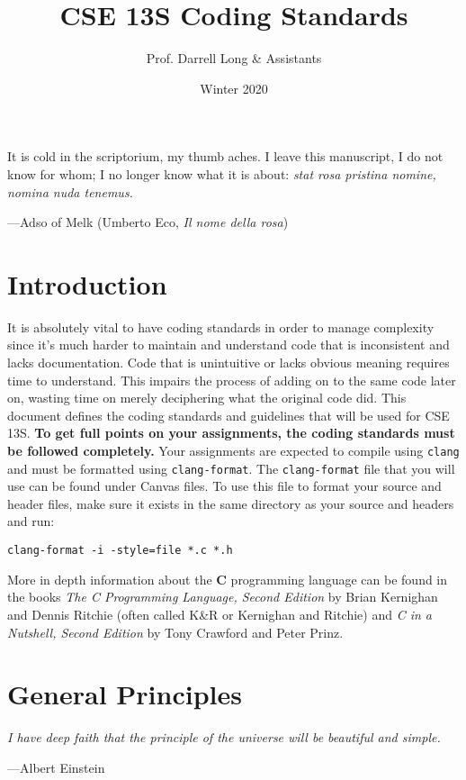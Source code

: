 \documentclass[11pt]{article}
\title{CSE 13S Coding Standards}
\author{Prof. Darrell Long \& Assistants}
\date{Winter 2020}
\begin{document}
\maketitle

\textwidth
\epigraph{It is cold in the scriptorium, my thumb aches. I leave
this manuscript, I do not know for whom; I no longer know what it
is about: \emph{stat rosa pristina nomine, nomina nuda tenemus.}}{---Adso of
Melk (Umberto Eco, \emph{Il nome della rosa})}

\section{Introduction}

It is absolutely vital to have coding standards in order to manage complexity
since it's much harder to maintain and understand code that is inconsistent and
lacks documentation. Code that is unintuitive or lacks obvious meaning requires
time to understand. This impairs the process of adding on to the same code
later on, wasting time on merely deciphering what the original code did.
This document defines the coding standards and guidelines that
will be used for CSE\,13S. \textbf{To get full points on your assignments, the
coding standards must be followed completely.} Your assignments are expected to
compile using \texttt{clang} and must be formatted using \texttt{clang-format}.
The \texttt{clang-format} file that you will use can be found under Canvas
files. To use this file to format your source and header files, make sure it
exists in the same directory as your source and headers and run:
\begin{lstlisting}
clang-format -i -style=file *.c *.h\end{lstlisting}

More in depth information about the \textbf{C} programming language can be found
in the books \emph{The C Programming Language, Second Edition} by Brian Kernighan
and Dennis Ritchie (often called K\&R or Kernighan and Ritchie) and \emph{C in a Nutshell, Second Edition} by Tony Crawford and Peter Prinz.

\section{General Principles}

\textwidth
\epigraph{\emph{I have deep faith that the principle of the universe will be
beautiful and simple.}}{---Albert Einstein}\noindent
\end{document}
